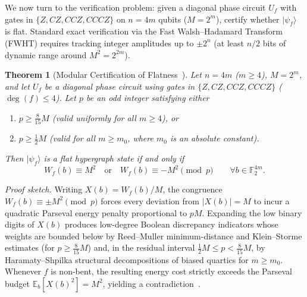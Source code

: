 \documentclass[11pt,a4paper]{article}
\newtheorem{theorem}{Theorem}
\newcommand{\F}{\mathbb{F}}
\newcommand{\ket}[1]{|#1\rangle}
\begin{document}
We now turn to the verification problem: given a diagonal phase circuit $U_f$ with gates in $\{Z, CZ, CCZ, CCCZ\}$ on $n = 4m$ qubits ($M = 2^m$), certify whether $\ket{\psi_f}$ is flat. Standard exact verification via the Fast Walsh--Hadamard Transform (FWHT) requires tracking integer amplitudes up to $\pm 2^n$ (at least $n/2$ bits of dynamic range around $M^2 = 2^{2m}$).

\begin{theorem}[Modular Certification of Flatness~\cite{Vono2026Rigidity}]
\label{thm:modular}
Let $n = 4m$ ($m \ge 4$), $M = 2^m$, and let $U_f$ be a diagonal phase circuit using gates in $\{Z, CZ, CCZ, CCCZ\}$ ($\deg(f) \le 4$). Let $p$ be an odd integer satisfying either
\begin{enumerate}
  \item $p \ge \frac{8}{15} M$ (valid uniformly for all $m \ge 4$), or
  \item $p \ge \frac{1}{2} M$ (valid for all $m \ge m_0$, where $m_0$ is an absolute constant).
\end{enumerate}
Then $\ket{\psi_f}$ is a flat hypergraph state if and only if
\[
  W_f(b) \equiv M^2 \quad \text{or} \quad W_f(b) \equiv -M^2 \pmod p
  \qquad \forall b \in \F_2^{4m}.
\]
\end{theorem}

\noindent\emph{Proof sketch.} Writing $X(b) = W_f(b)/M$, the congruence $W_f(b) \equiv \pm M^2 \pmod p$ forces every deviation from $|X(b)| = M$ to incur a quadratic Parseval energy penalty proportional to $pM$. Expanding the low binary digits of $X(b)$ produces low-degree Boolean discrepancy indicators whose weights are bounded below by Reed--Muller minimum-distance and Klein--Storme estimates (for $p \ge \frac{8}{15}M$) and, in the residual interval $\frac{1}{2}M \le p < \frac{8}{15}M$, by Haramaty--Shpilka structural decompositions of biased quartics for $m \ge m_0$. Whenever $f$ is non-bent, the resulting energy cost strictly exceeds the Parseval budget $\mathbb{E}_b[X(b)^2] = M^2$, yielding a contradiction~\cite{Vono2026Rigidity}.
\end{document}
